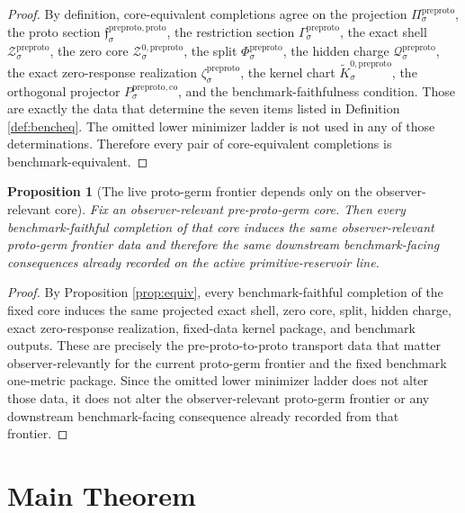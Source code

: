 \documentclass[11pt]{article}
\newcommand{\PreProtoProj}[1]{\Pi_{#1}^{\mathrm{preproto}}}
\newcommand{\PreProtoProtoMin}[1]{\mathfrak f_{#1}^{\mathrm{preproto,proto}}}
\newcommand{\PreProtoSection}[1]{\Gamma_{#1}^{\mathrm{preproto}}}
\newcommand{\PreProtoShellSet}[1]{\mathcal Z_{#1}^{\mathrm{preproto}}}
\newcommand{\PreProtoZeroCore}[1]{\mathcal Z_{#1}^{0,\mathrm{preproto}}}
\newcommand{\PreProtoSplit}[1]{\Phi_{#1}^{\mathrm{preproto}}}
\newcommand{\PreProtoCharge}[1]{\mathcal Q_{#1}^{\mathrm{preproto}}}
\newcommand{\PreProtoEmbed}[1]{\zeta_{#1}^{\mathrm{preproto}}}
\newcommand{\PreProtoKernelCh}[1]{\widetilde K_{#1}^{0,\mathrm{preproto}}}
\newcommand{\PreProtoStateComp}[1]{P_{#1}^{\mathrm{preproto,co}}}
\newtheorem{proposition}{Proposition}
\begin{document}
\begin{proof}
By definition, core-equivalent completions agree on the projection \(\PreProtoProj{\sigma}\), the proto section \(\PreProtoProtoMin{\sigma}\), the restriction section \(\PreProtoSection{\sigma}\), the exact shell \(\PreProtoShellSet{\sigma}\), the zero core \(\PreProtoZeroCore{\sigma}\), the split \(\PreProtoSplit{\sigma}\), the hidden charge \(\PreProtoCharge{\sigma}\), the exact zero-response realization \(\PreProtoEmbed{\sigma}\), the kernel chart \(\PreProtoKernelCh{\sigma}\), the orthogonal projector \(\PreProtoStateComp{\sigma}\), and the benchmark-faithfulness condition. Those are exactly the data that determine the seven items listed in Definition \ref{def:bencheq}. The omitted lower minimizer ladder is not used in any of those determinations. Therefore every pair of core-equivalent completions is benchmark-equivalent.
\end{proof}

\begin{proposition}[The live proto-germ frontier depends only on the observer-relevant core]
\label{prop:frontier}
Fix an observer-relevant pre-proto-germ core. Then every benchmark-faithful completion of that core induces the same observer-relevant proto-germ frontier data and therefore the same downstream benchmark-facing consequences already recorded on the active primitive-reservoir line.
\end{proposition}

\begin{proof}
By Proposition \ref{prop:equiv}, every benchmark-faithful completion of the fixed core induces the same projected exact shell, zero core, split, hidden charge, exact zero-response realization, fixed-data kernel package, and benchmark outputs. These are precisely the pre-proto-to-proto transport data that matter observer-relevantly for the current proto-germ frontier and the fixed benchmark one-metric package. Since the omitted lower minimizer ladder does not alter those data, it does not alter the observer-relevant proto-germ frontier or any downstream benchmark-facing consequence already recorded from that frontier.
\end{proof}

\section{Main Theorem}
\end{document}
